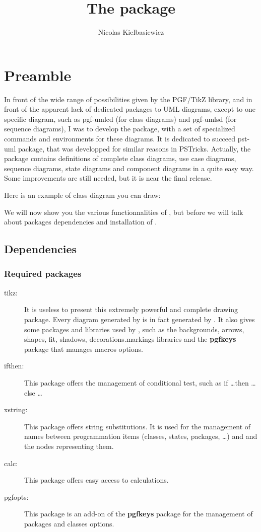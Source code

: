 \documentclass[a4paper,11pt]{report}
\title{The \tuml package} %
\author{Nicolas {\sc Kielbasiewicz}} %
\begin{document}
\maketitle

\tableofcontents

\chapter{Preamble}

In front of the wide range of possibilities given by the {\sc PGF/TikZ} library, and in front of the apparent lack of dedicated packages to UML diagrams, except to one specific diagram, such as pgf-umlcd (for class diagrams) and pgf-umlsd (for sequence diagrams), I was to develop the \tuml package, with a set of specialized commands and environments for these diagrams.
It is dedicated to succeed pst-uml package, that was developped for similar reasons in {\sc PSTricks}. Actually, the package contains definitions of complete class diagrams, use case diagrams, sequence diagrams, state diagrams and component diagrams in a quite easy way. Some improvements are still needed, but it is near the final release. 

Here is an example of class diagram you can draw:

\begin{center}
\end{center}

We will now show you the various functionnalities of \tuml, but before we will talk about packages dependencies and installation of \tuml.

\section{Dependencies}

\subsection{Required packages}

\begin{description}
\item[tikz:] It is useless to present this extremely powerful and complete drawing package. Every diagram generated by \tuml is in fact generated by \TikZ. It also gives some packages and libraries used by \tuml, such as the backgrounds, arrows, shapes, fit, shadows, decorations.markings libraries and the {\bf pgfkeys} package that manages macros options.
\item[ifthen:] This package offers the management of conditional test, such as if \ldots then \ldots else \ldots
\item[xstring:] This package offers string substitutions. It is used for the management of names between programmation items (classes, states, packages, \ldots) and and the nodes representing them.
\item[calc:] This package offers easy access to calculations.
\item[pgfopts:] This package is an add-on of the {\bf pgfkeys} package for the management of packages and classes options.
\end{description}
\end{document}
